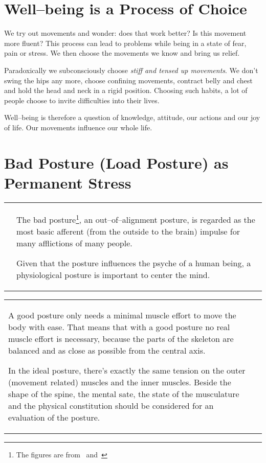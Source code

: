 \documentclass[../main.tex]{subfiles}
\begin{document}
\section{Well--being is a Process of Choice}

We try out movements and wonder: does that {work better}?
Is this movement more fluent?
This process can lead to problems while being in a state of fear, pain or stress.
We then choose the movements we know and bring us relief.

Paradoxically we subconsciously choose \emph{stiff and tensed up movements}.
We don't swing the hips any more, choose confining movements, contract belly and chest and hold the head and neck in a rigid position.
Choosing such habits, a lot of people choose to  {invite difficulties} into their lives.

{Well--being} is therefore a question of knowledge, attitude, our actions and our joy of life.
Our movements influence our whole life.

\section{Bad Posture (Load Posture) as Permanent Stress}

\noindent
\begin{minipage}{\textwidth}
\begin{tabular}{p{4cm}p{7.6cm}}

  \raisebox{-0.8\totalheight}{  \texttt{[image: Thumb\_head]} }

  &
The bad posture\footnote{The figures are from~\cite{Haltung} and~\cite{Darmreinig}}\index{posture!bad}, an out--of--alignment posture, is regarded as the {most basic afferent} (from the outside to the brain) impulse for many afflictions of many people. 

Given that the posture influences the psyche of a human being, a physiological posture is important to {center the mind}.\index{posture!psyche}\index{effect!mind, center} 
\end{tabular}

\noindent
\begin{tabular}{p{7.6cm}p{4cm}}
A good posture only needs a {minimal muscle effort to move} the body with ease.\index{posture!good, natural}
That means that with a good posture no real muscle effort is necessary, because the parts of the skeleton are {balanced} and as close as possible from the {central axis}. 

In the ideal posture, there's exactly the {same tension} on the outer (movement related) muscles and the inner muscles.
{Beside the shape of the spine, the mental sate, the state of the musculature and the physical constitution should be considered for an evaluation of the posture.}
  &
     \raisebox{-0.85\totalheight}{  \texttt{[image: Smiling\_Guy]} }
\end{tabular}
\end{minipage}
\end{document}
